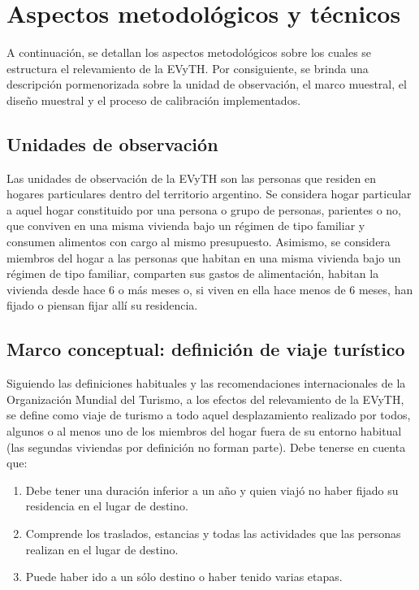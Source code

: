\documentclass[
  openany]{book}
\begin{document}
\hypertarget{aspectos-metodoluxf3gicos-y-tuxe9cnicos}{%
\chapter{\texorpdfstring{\textbf{Aspectos metodológicos y técnicos}}{Aspectos metodológicos y técnicos}}\label{aspectos-metodoluxf3gicos-y-tuxe9cnicos}}

A continuación, se detallan los aspectos metodológicos sobre los cuales se estructura el relevamiento de la EVyTH. Por consiguiente, se brinda una descripción pormenorizada sobre la unidad de observación, el marco muestral, el diseño muestral y el proceso de calibración implementados.

\hypertarget{unidades-de-observaciuxf3n}{%
\section{Unidades de observación}\label{unidades-de-observaciuxf3n}}

Las unidades de observación de la EVyTH son las personas que residen en hogares particulares dentro del territorio argentino. Se considera hogar particular a aquel hogar constituido por una persona o grupo de personas, parientes o no, que conviven en una misma vivienda bajo un régimen de tipo familiar y consumen alimentos con cargo al mismo presupuesto. Asimismo, se considera miembros del hogar a las personas que habitan en una misma vivienda bajo un régimen de tipo familiar, comparten sus gastos de alimentación, habitan la vivienda desde hace 6 o más meses o, si viven en ella hace menos de 6 meses, han fijado o piensan fijar allí su residencia.

\hypertarget{marco-conceptual-definiciuxf3n-de-viaje-turuxedstico}{%
\section{Marco conceptual: definición de viaje turístico}\label{marco-conceptual-definiciuxf3n-de-viaje-turuxedstico}}

Siguiendo las definiciones habituales y las recomendaciones internacionales de la Organización Mundial del Turismo, a los efectos del relevamiento de la EVyTH, se define como viaje de turismo a todo aquel desplazamiento realizado por todos, algunos o al menos uno de los miembros del hogar fuera de su entorno habitual (las segundas viviendas por definición no forman parte). Debe tenerse en cuenta que:

\begin{enumerate}
\def\labelenumi{\arabic{enumi}.}
\item
  Debe tener una duración inferior a un año y quien viajó no haber fijado su residencia en el lugar de destino.
\item
  Comprende los traslados, estancias y todas las actividades que las personas realizan en el lugar de destino.
\item
  Puede haber ido a un sólo destino o haber tenido varias etapas.
\end{enumerate}
\end{document}
